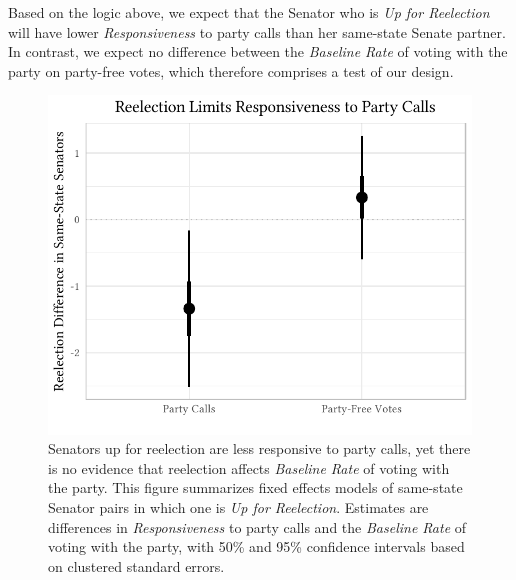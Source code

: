 \documentclass[12pt]{article}
\begin{document}
Based on the logic above, we expect that the Senator who is \textit{Up for Reelection} will have lower \textit{Responsiveness} to party calls than her same-state Senate partner.  In contrast, we expect no difference between the \textit{Baseline Rate} of voting with the party on party-free votes, which therefore comprises a test of our design.

\begin{figure}[t]
\centering
\includegraphics[width = 12cm]{senate_difference_estimates.pdf}

\caption{Senators up for reelection are less responsive to party calls, yet there is no evidence that reelection affects \textit{Baseline Rate} of voting with the party.  This figure summarizes fixed effects models of same-state Senator pairs in which one is \textit{Up for Reelection}.  Estimates are differences in \textit{Responsiveness} to party calls and the \textit{Baseline Rate} of voting with the party, with 50\% and 95\% confidence intervals based on clustered standard errors.
\label{fig-reelection-responsiveness}}
\end{figure}
\end{document}
